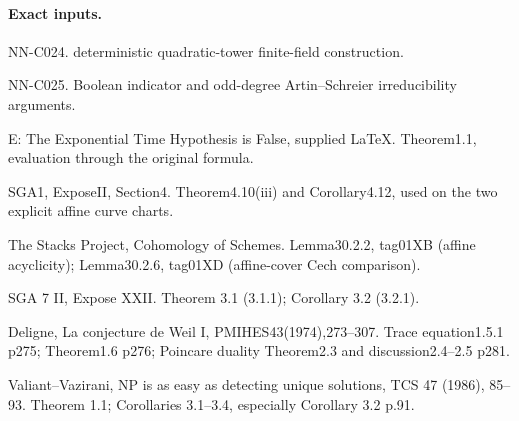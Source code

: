 \paragraph{Exact inputs.}
NN-C024. deterministic quadratic-tower finite-field construction.

NN-C025. Boolean indicator and odd-degree Artin--Schreier irreducibility arguments.

E: The Exponential Time Hypothesis is False, supplied LaTeX. Theorem1.1, evaluation through the original formula.

SGA1, ExposeII, Section4. Theorem4.10(iii) and Corollary4.12, used on the two explicit affine curve charts.

The Stacks Project, Cohomology of Schemes. Lemma30.2.2, tag01XB (affine acyclicity); Lemma30.2.6, tag01XD (affine-cover Cech comparison).

SGA 7 II, Expose XXII. Theorem 3.1 (3.1.1); Corollary 3.2 (3.2.1).

Deligne, La conjecture de Weil I, PMIHES43(1974),273--307. Trace equation1.5.1 p275; Theorem1.6 p276; Poincare duality Theorem2.3 and discussion2.4--2.5 p281.

Valiant--Vazirani, NP is as easy as detecting unique solutions, TCS 47 (1986), 85--93. Theorem 1.1; Corollaries 3.1--3.4, especially Corollary 3.2 p.91.

